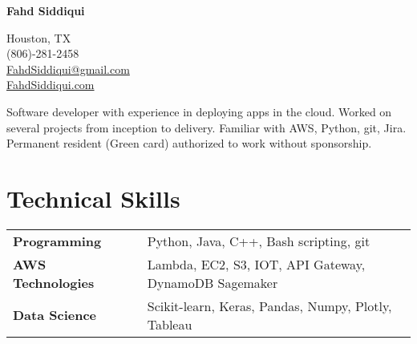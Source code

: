 \documentclass[letter,10pt]{article}
\newcommand{\hskills}[1]{
	\textbf{\bfseries #1} }
\begin{document}
	
		\begin{minipage}[c]{0.7\textwidth}
			\raggedright {\fontsize{45}{60}\selectfont \textbf{Fahd Siddiqui}} \hfill \\ %
		\end{minipage}%
		\begin{minipage}[c]{0.3\textwidth}
			\hfill \raggedleft \normalsize Houston, TX \\
			\raggedleft \normalsize (806)-281-2458 \\
			\raggedleft \normalsize \href{mailto:FahdSiddiqui@gmail.com}{FahdSiddiqui@gmail.com} \\
			\raggedleft \normalsize \href{FahdSiddiqui.com}{FahdSiddiqui.com} 
		\end{minipage}   
		
		\vspace{0.25cm} 
		{\color{UI_black} \hrulefill}
	
	\vspace{0.2 cm}
	Software developer with experience in deploying apps in the cloud. Worked on several projects from inception to delivery. Familiar with AWS, Python, git, Jira. Permanent resident (Green card) authorized to work without sponsorship.
	\vspace{-0.2cm}
	
	
	\section{Technical Skills}
	\begin{tabular}{p{11em} p{1em} p{43em}}
		\hskills{Programming} &  & Python, Java, C++, Bash scripting, git  \\
		\hskills{AWS Technologies}&  &  Lambda, EC2, S3, IOT, API Gateway, DynamoDB Sagemaker \\
		\hskills{Data Science} &  & Scikit-learn, Keras, Pandas, Numpy, Plotly, Tableau \\
	\end{tabular}
	\vspace{-0.2cm}
	
\end{document}
